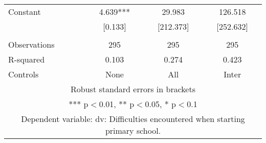 \begin{tabular}{lccc}
Constant & 4.639*** & 29.983 & 126.518 \\
 & [0.133] & [212.373] & [252.632] \\
 &  &  &  \\
Observations & 295 & 295 & 295 \\
R-squared & 0.103 & 0.274 & 0.423 \\
 Controls & None & All & Inter \\ \hline
\multicolumn{4}{c}{ Robust standard errors in brackets} \\
\multicolumn{4}{c}{ *** p$<$0.01, ** p$<$0.05, * p$<$0.1} \\
\multicolumn{4}{c}{ Dependent variable: dv: Difficulties encountered when starting primary school.} \\
\end{tabular}

